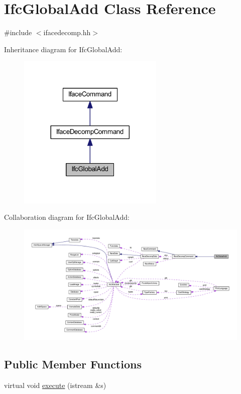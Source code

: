 \hypertarget{class_ifc_global_add}{}\section{Ifc\+Global\+Add Class Reference}
\label{class_ifc_global_add}


{\ttfamily \#include $<$ifacedecomp.\+hh$>$}



Inheritance diagram for Ifc\+Global\+Add\+:
\nopagebreak
\begin{figure}[H]
\begin{center}
\leavevmode
\includegraphics[width=197pt]{class_ifc_global_add__inherit__graph}
\end{center}
\end{figure}


Collaboration diagram for Ifc\+Global\+Add\+:
\nopagebreak
\begin{figure}[H]
\begin{center}
\leavevmode
\includegraphics[width=350pt]{class_ifc_global_add__coll__graph}
\end{center}
\end{figure}
\subsection*{Public Member Functions}
\begin{DoxyCompactItemize}
\item 
virtual void \mbox{\hyperlink{class_ifc_global_add_a727b49481db6ac9ae722fbce15ab595c}{execute}} (istream \&s)
\end{DoxyCompactItemize}
